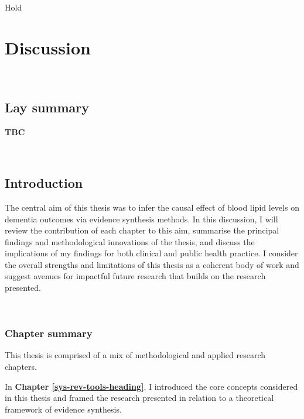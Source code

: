 \documentclass[a4paper, twoside]{templates/ociamthesis}
\begin{document}
\begin{savequote}
Hold
\end{savequote}



\hypertarget{discussion-heading}{%
\chapter{Discussion}\label{discussion-heading}}

~

\minitoc 

\newpage

\begin{laybox}

\hypertarget{lay-summary-7}{%
\section{Lay summary}\label{lay-summary-7}}

\textbf{TBC}

\end{laybox}

~

\hypertarget{introduction-4}{%
\section{Introduction}\label{introduction-4}}

The central aim of this thesis was to infer the causal effect of blood lipid levels on dementia outcomes via evidence synthesis methods. In this discussion, I will review the contribution of each chapter to this aim, summarise the principal findings and methodological innovations of the thesis, and discuss the implications of my findings for both clinical and public health practice. I consider the overall strengths and limitations of this thesis as a coherent body of work and suggest avenues for impactful future research that builds on the research presented.

~

\hypertarget{chapter-summary}{%
\subsection{Chapter summary}\label{chapter-summary}}

This thesis is comprised of a mix of methodological and applied research chapters.

In \textbf{Chapter \ref{sys-rev-tools-heading}}, I introduced the core concepts considered in this thesis and framed the research presented in relation to a theoretical framework of evidence synthesis.
\end{document}
